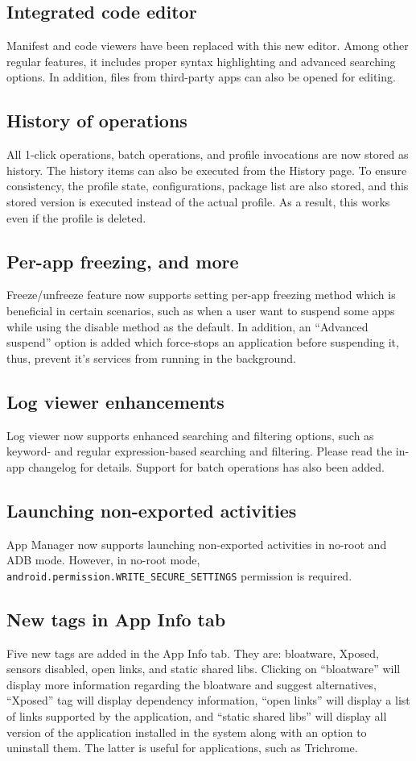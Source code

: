 \subsection{Integrated code editor}
Manifest and code viewers have been replaced with this new editor. Among other regular features, it
includes proper syntax highlighting and advanced searching options. In addition, files from
third-party apps can also be opened for editing.

\subsection{History of operations}
All 1-click operations, batch operations, and profile invocations are now stored as history. The
history items can also be executed from the History page. To ensure consistency, the profile state,
configurations, package list are also stored, and this stored version is executed instead of the
actual profile. As a result, this works even if the profile is deleted.

\subsection{Per-app freezing, and more}
Freeze/unfreeze feature now supports setting per-app freezing method which is beneficial in certain
scenarios, such as when a user want to suspend some apps while using the disable method as the
default. In addition, an ``Advanced suspend'' option is added which force-stops an application
before suspending it, thus, prevent it's services from running in the background.

\subsection{Log viewer enhancements}
Log viewer now supports enhanced searching and filtering options, such as keyword- and regular
expression-based searching and filtering. Please read the in-app changelog for details. Support for
batch operations has also been added.

\subsection{Launching non-exported activities}
App Manager now supports launching non-exported activities in no-root and ADB mode. However, in
no-root mode, \texttt{android.permission.WRITE\_SECURE\_SETTINGS} permission is required.

\subsection{New tags in App Info tab}
Five new tags are added in the App Info tab. They are: bloatware, Xposed, sensors disabled, open
links, and static shared libs. Clicking on ``bloatware'' will display more information regarding
the bloatware and suggest alternatives, ``Xposed'' tag will display dependency information, ``open
links'' will display a list of links supported by the application, and ``static shared libs'' will
display all version of the application installed in the system along with an option to uninstall
them. The latter is useful for applications, such as Trichrome.


